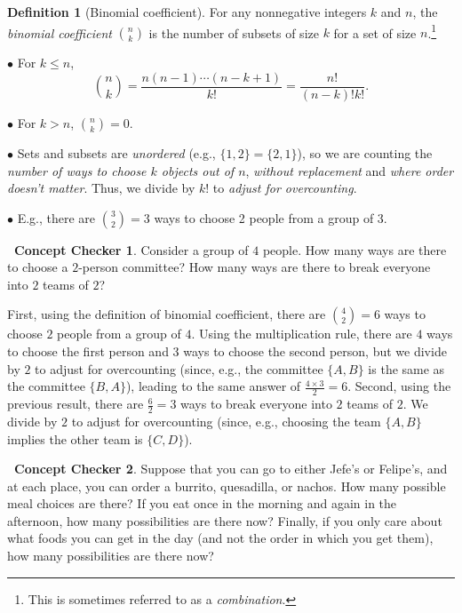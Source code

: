 \documentclass[12pt,oneside]{article}
\theoremstyle{definition}
\newtheorem{definition}{Definition}
\newtheorem{concept}{\faPen \ Concept Checker}
\theoremstyle{remark}
\begin{document}
\begin{definition}[Binomial coefficient]
For any nonnegative integers $k$ and $n$, the \textit{binomial coefficient} $\binom{n}{k}$ is the number of subsets of size $k$ for a set of size $n$.\footnote{This is sometimes referred to as a \textit{combination}.}

$\bullet$ For $k \leq n$, \[\binom{n}{k} = \frac{n (n - 1) \cdots (n - k + 1)}{k!} = \frac{n!}{(n - k)! k!}.\]

$\bullet$ For $k > n$, $\binom{n}{k} = 0$.

$\bullet$ Sets and subsets are \textit{unordered} (e.g., $\{1, 2\} = \{2, 1\}$), so we are counting the \textit{number of ways to choose $k$ objects out of $n$}, \textit{without replacement} and \textit{where order doesn't matter}. Thus, we divide by $k!$ to \textit{adjust for overcounting}.

$\bullet$ E.g., there are $\binom{3}{2} = 3$ ways to choose 2 people from a group of 3.
\end{definition}

\begin{concept}
Consider a group of $4$ people. How many ways are there to choose a $2$-person committee? How many ways are there to break everyone into $2$ teams of $2$?
\end{concept}

\begin{solutionbox}
First, using the definition of binomial coefficient, there are $\binom{4}{2} = 6$ ways to choose $2$ people from a group of $4$. Using the multiplication rule, there are $4$ ways to choose the first person and $3$ ways to choose the second person, but we divide by $2$ to adjust for overcounting (since, e.g., the committee $\{A, B\}$ is the same as the committee $\{B, A\}$), leading to the same answer of $\frac{4 \times 3}{2} = 6$. Second, using the previous result, there are $\frac{6}{2} = 3$ ways to break everyone into $2$ teams of $2$. We divide by $2$ to adjust for overcounting (since, e.g., choosing the team $\{A, B\}$ implies the other team is $\{C, D\}$).
\end{solutionbox}

\begin{concept}
Suppose that you can go to either Jefe's or Felipe's, and at each place, you can order a burrito, quesadilla, or nachos. How many possible meal choices are there? If you eat once in the morning and again in the afternoon, how many possibilities are there now? Finally, if you only care about what foods you can get in the day (and not the order in which you get them), how many possibilities are there now?
\end{concept}
\end{document}
